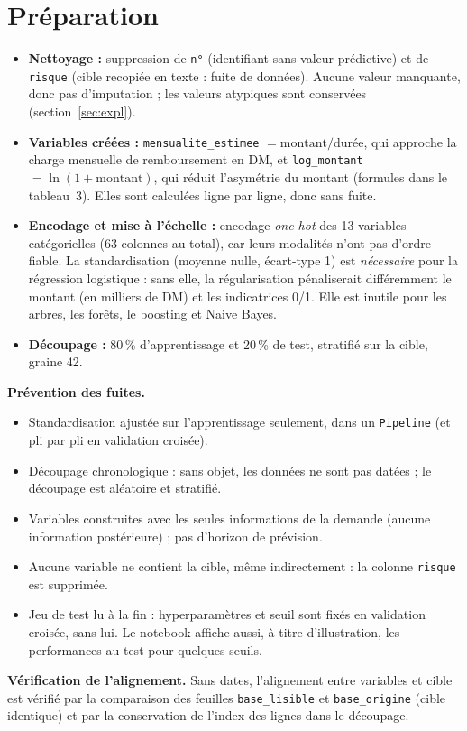 \documentclass[12pt,a4paper]{article}
\begin{document}
\section{Préparation}\label{sec:prep}
\begin{itemize}
\item \textbf{Nettoyage :} suppression de \texttt{n°} (identifiant sans valeur prédictive) et de \texttt{risque} (cible recopiée en texte : fuite de données). Aucune valeur manquante, donc pas d’imputation ; les valeurs atypiques sont conservées (section~\ref{sec:expl}).
\item \textbf{Variables créées :} \texttt{mensualite\_estimee} $=\text{montant}/\text{durée}$, qui approche la charge mensuelle de remboursement en DM, et \texttt{log\_montant} $=\ln(1+\text{montant})$, qui réduit l’asymétrie du montant (formules dans le tableau~3). Elles sont calculées ligne par ligne, donc sans fuite.
\item \textbf{Encodage et mise à l’échelle :} encodage \emph{one-hot} des 13 variables catégorielles (63 colonnes au total), car leurs modalités n’ont pas d’ordre fiable. La standardisation (moyenne nulle, écart-type 1) est \emph{nécessaire} pour la régression logistique : sans elle, la régularisation pénaliserait différemment le montant (en milliers de DM) et les indicatrices 0/1. Elle est inutile pour les arbres, les forêts, le boosting et Naive Bayes.
\item \textbf{Découpage :} 80\,\% d’apprentissage et 20\,\% de test, stratifié sur la cible, graine 42.
\end{itemize}

\textbf{Prévention des fuites.}
\begin{itemize}[label=$\boxtimes$,leftmargin=1.8em]
\item Standardisation ajustée sur l’apprentissage seulement, dans un \texttt{Pipeline} (et pli par pli en validation croisée).
\item Découpage chronologique : sans objet, les données ne sont pas datées ; le découpage est aléatoire et stratifié.
\item Variables construites avec les seules informations de la demande (aucune information postérieure) ; pas d’horizon de prévision.
\item Aucune variable ne contient la cible, même indirectement : la colonne \texttt{risque} est supprimée.
\item Jeu de test lu à la fin : hyperparamètres et seuil sont fixés en validation croisée, sans lui. Le notebook affiche aussi, à titre d’illustration, les performances au test pour quelques seuils.
\end{itemize}
\textbf{Vérification de l’alignement.} Sans dates, l’alignement entre variables et cible est vérifié par la comparaison des feuilles \texttt{base\_lisible} et \texttt{base\_origine} (cible identique) et par la conservation de l’index des lignes dans le découpage.
\end{document}
